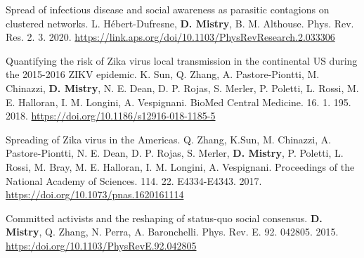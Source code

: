 \begin{cventries}
  \cvpublicationentrytwo
    {Spread of infectious disease and social awareness as parasitic contagions on clustered networks.} %
    {L. Hébert-Dufresne, \textbf{D. Mistry}, B. M. Althouse.} %
    {Phys. Rev. Res.} %
    {2.} %
    {3.} %
    {\hspace{-1mm}} %
    {2020.} %
    {\hspace{-1mm}} %
    {\href{https://link.aps.org/doi/10.1103/PhysRevResearch.2.033306}{https://link.aps.org/doi/10.1103/PhysRevResearch.2.033306 \faLink\acvHeaderIconSep}} %
    \vspace{1.5mm}

  \cvpublicationentrytwo
    {Quantifying the risk of Zika virus local transmission in the continental US during the 2015-2016 ZIKV epidemic.} %
    {K. Sun, Q. Zhang, A. Pastore-Piontti, M. Chinazzi, \textbf{D. Mistry}, N. E. Dean, D. P. Rojas, S. Merler, P. Poletti, L. Rossi, M. E. Halloran, I. M. Longini, A. Vespignani.} %
    {BioMed Central Medicine. } %
    {16.} %
    {1.} %
    {195.} %
    {2018.} %
    {} %
    {\href{https://doi.org/10.1186/s12916-018-1185-5}{https://doi.org/10.1186/s12916-018-1185-5 \faLink\acvHeaderIconSep}} %
    \vspace{1.5mm}

  \cvpublicationentrytwo
    {Spreading of Zika virus in the Americas.} %
    {Q. Zhang, K.Sun, M. Chinazzi, A. Pastore-Piontti, N. E. Dean, D. P. Rojas, S. Merler, \textbf{D. Mistry}, P. Poletti, L. Rossi, M. Bray, M. E. Halloran, I. M. Longini, A. Vespignani.} %
    {Proceedings of the National Academy of Sciences. } %
    { 114.} %
    { 22. } %
    {  E4334-E4343. } %
    { 2017.} %
    {} %
    {\href{https://doi.org/10.1073/pnas.1620161114}{https://doi.org/10.1073/pnas.1620161114
    \faLink\acvHeaderIconSep}} %
    \vspace{1.5mm}

  \cvpublicationentrytwo
    {Committed activists and the reshaping of status-quo social consensus.} %
    {\textbf{D. Mistry}, Q. Zhang, N. Perra, A. Baronchelli.} %
    {Phys. Rev. E.} %
    { 92.} %
    { } %
    {042805. } %
    { 2015.} %
    {} %
    {\href{https:/doi.org/10.1103/PhysRevE.92.042805}{https:/doi.org/10.1103/PhysRevE.92.042805 \faLink\acvHeaderIconSep}} %
    \vspace{2mm}

\end{cventries}

